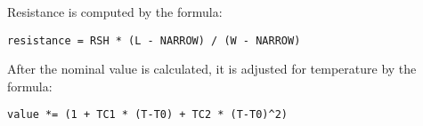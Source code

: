 Resistance is computed by the formula:

\begin{verbatim}
resistance = RSH * (L - NARROW) / (W - NARROW)
\end{verbatim}

After the nominal value is calculated, it is adjusted for temperature
by the formula:

\begin{verbatim}
value *= (1 + TC1 * (T-T0) + TC2 * (T-T0)^2)
\end{verbatim}
